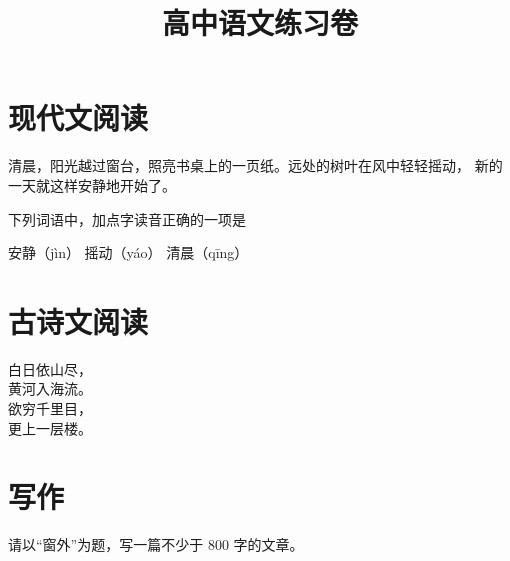 \documentclass{exam-zh}
\begin{document}
\title{高中语文练习卷}
\subject{语文}
\maketitle

\section{现代文阅读}

\begin{material}
  [
    title = {春日小记},
    author = {佚名},
    source = {（节选）}
  ]
  清晨，阳光越过窗台，照亮书桌上的一页纸。远处的树叶在风中轻轻摇动，
  新的一天就这样安静地开始了。
\end{material}

\begin{question}
  下列词语中，加点字读音正确的一项是
  \begin{select}[show-mark = true]
    \sitem 安静（jìn）
    \sitem* 摇动（yáo）
    \sitem 清晨（qīng）
  \end{select}
\end{question}

\section{古诗文阅读}

\begin{poem}[title = {登鹳雀楼}, author = {王之涣}]
  白日依山尽，\\
  黄河入海流。\\
  欲穷千里目，\\
  更上一层楼。
\end{poem}

\section{写作}

请以“窗外”为题，写一篇不少于 800 字的文章。

\end{document}
